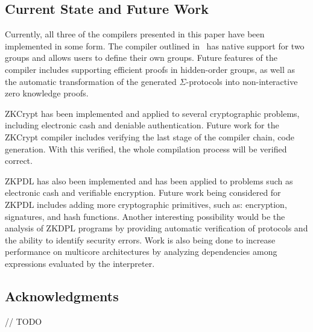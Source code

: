 \documentclass{sig-alternate}
\begin{document}
	\subsection{Current State and Future Work}
	Currently, all three of the compilers presented in this paper have
	been implemented in some form. The compiler outlined in~\cite{Sigma:2009}
	has native support for two groups and allows users to define their own
	groups. Future features of the compiler includes supporting efficient
	proofs in hidden-order groups, as well as the automatic transformation
	of the generated $\Sigma$-protocols into non-interactive zero knowledge
	proofs.
	
	ZKCrypt has been implemented and applied to several cryptographic
	problems, including electronic cash and deniable authentication.
	Future work for the ZKCrypt compiler includes verifying the last
	stage of the compiler chain, code generation. With this verified,
	the whole compilation process will be verified correct.
	
	ZKPDL has also been implemented and has been applied to problems
	such as electronic cash and verifiable encryption. Future work being
	considered for ZKPDL includes adding more cryptographic primitives,
	such as: encryption, signatures, and hash functions. Another interesting
	possibility would be the analysis of ZKDPL programs by providing automatic
	verification of protocols and the ability to identify security errors.
	Work is also being done to increase performance on multicore architectures
	by analyzing dependencies among expressions evaluated by the interpreter.	
	
	\subsection{Acknowledgments}
	// TODO




\end{document}
